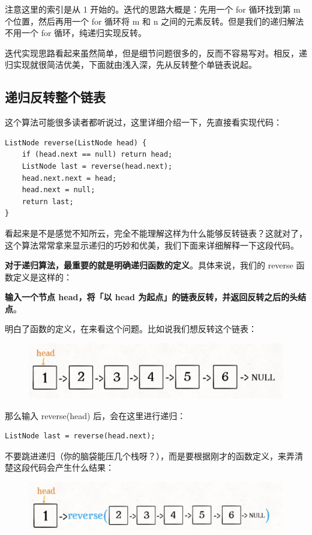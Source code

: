\documentclass[12pt]{article}
\begin{document}
注意这里的索引是从 1 开始的。迭代的思路大概是：先用一个 for 循环找到第 m 个位置，然后再用一个 for 循环将 m 和 n 之间的元素反转。但是我们的递归解法不用一个 for 循环，纯递归实现反转。

迭代实现思路看起来虽然简单，但是细节问题很多的，反而不容易写对。相反，递归实现就很简洁优美，下面就由浅入深，先从反转整个单链表说起。

\subsection{递归反转整个链表}
这个算法可能很多读者都听说过，这里详细介绍一下，先直接看实现代码：
\begin{lstlisting}
ListNode reverse(ListNode head) {
    if (head.next == null) return head;
    ListNode last = reverse(head.next);
    head.next.next = head;
    head.next = null;
    return last;
}
\end{lstlisting}
看起来是不是感觉不知所云，完全不能理解这样为什么能够反转链表？这就对了，这个算法常常拿来显示递归的巧妙和优美，我们下面来详细解释一下这段代码。

\textbf{对于递归算法，最重要的就是明确递归函数的定义}。具体来说，我们的 reverse 函数定义是这样的：

\textbf{输入一个节点 head，将「以 head 为起点」的链表反转，并返回反转之后的头结点}。

明白了函数的定义，在来看这个问题。比如说我们想反转这个链表：
\begin{figure}[H]
    \centering
    \includegraphics[width=.5\textwidth]{fig/Reverse_Single_List_2.png}
\end{figure}

那么输入 reverse(head) 后，会在这里进行递归：
\begin{lstlisting}
ListNode last = reverse(head.next);
\end{lstlisting}

不要跳进递归（你的脑袋能压几个栈呀？），而是要根据刚才的函数定义，来弄清楚这段代码会产生什么结果：
\begin{figure}[H]
    \centering
    \includegraphics[width=.5\textwidth]{fig/Reverse_Single_List_3.png}
\end{figure}
\end{document}
